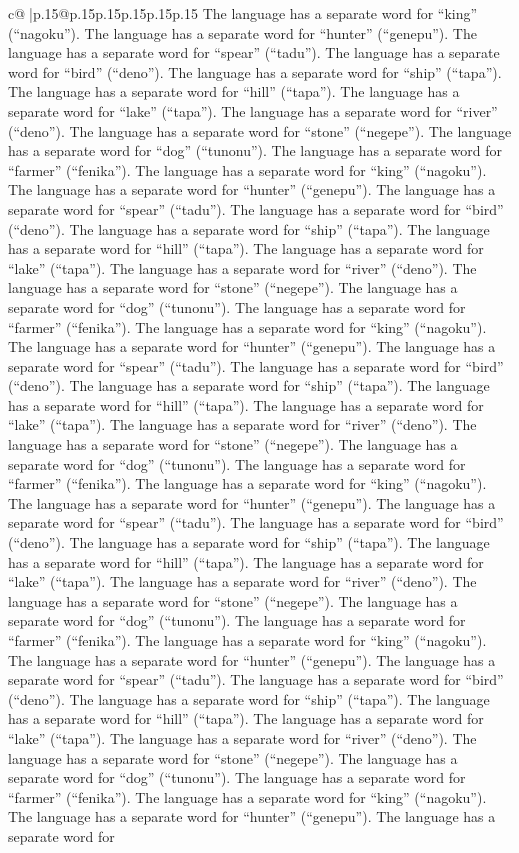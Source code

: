 \documentclass{article}
\begin{document}
{\begin{supertabular}{c@{$\;$}|p{.15\linewidth}@{}p{.15\linewidth}p{.15\linewidth}p{.15\linewidth}p{.15\linewidth}p{.15\linewidth}}
{{{The language has a separate word for “king” (“nagoku”). The language has a separate word for “hunter” (“genepu”). The language has a separate word for “spear” (“tadu”). The language has a separate word for “bird” (“deno”). The language has a separate word for “ship” (“tapa”). The language has a separate word for “hill” (“tapa”). The language has a separate word for “lake” (“tapa”). The language has a separate word for “river” (“deno”). The language has a separate word for “stone” (“negepe”). The language has a separate word for “dog” (“tunonu”). The language has a separate word for “farmer” (“fenika”). The language has a separate word for “king” (“nagoku”). The language has a separate word for “hunter” (“genepu”). The language has a separate word for “spear” (“tadu”). The language has a separate word for “bird” (“deno”). The language has a separate word for “ship” (“tapa”). The language has a separate word for “hill” (“tapa”). The language has a separate word for “lake” (“tapa”). The language has a separate word for “river” (“deno”). The language has a separate word for “stone” (“negepe”). The language has a separate word for “dog” (“tunonu”). The language has a separate word for “farmer” (“fenika”). The language has a separate word for “king” (“nagoku”). The language has a separate word for “hunter” (“genepu”). The language has a separate word for “spear” (“tadu”). The language has a separate word for “bird” (“deno”). The language has a separate word for “ship” (“tapa”). The language has a separate word for “hill” (“tapa”). The language has a separate word for “lake” (“tapa”). The language has a separate word for “river” (“deno”). The language has a separate word for “stone” (“negepe”). The language has a separate word for “dog” (“tunonu”). The language has a separate word for “farmer” (“fenika”). The language has a separate word for “king” (“nagoku”). The language has a separate word for “hunter” (“genepu”). The language has a separate word for “spear” (“tadu”). The language has a separate word for “bird” (“deno”). The language has a separate word for “ship” (“tapa”). The language has a separate word for “hill” (“tapa”). The language has a separate word for “lake” (“tapa”). The language has a separate word for “river” (“deno”). The language has a separate word for “stone” (“negepe”). The language has a separate word for “dog” (“tunonu”). The language has a separate word for “farmer” (“fenika”). The language has a separate word for “king” (“nagoku”). The language has a separate word for “hunter” (“genepu”). The language has a separate word for “spear” (“tadu”). The language has a separate word for “bird” (“deno”). The language has a separate word for “ship” (“tapa”). The language has a separate word for “hill” (“tapa”). The language has a separate word for “lake” (“tapa”). The language has a separate word for “river” (“deno”). The language has a separate word for “stone” (“negepe”). The language has a separate word for “dog” (“tunonu”). The language has a separate word for “farmer” (“fenika”). The language has a separate word for “king” (“nagoku”). The language has a separate word for “hunter” (“genepu”). The language has a separate word for }}}
\end{supertabular}}
\end{document}
